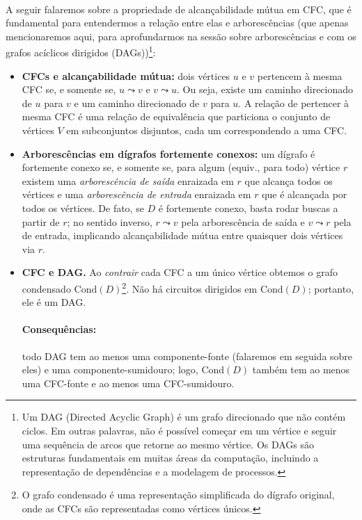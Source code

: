 \documentclass[12pt,a4paper]{article}
\begin{document}
\paragraph{}
A seguir falaremos sobre a propriedade de alcançabilidade mútua em CFC, que é fundamental para entendermos a relação entre elas e arborescências (que apenas mencionaremos aqui, para aprofundarmos na sessão sobre arborescências e com os grafos acíclicos dirigidos (DAGs))\footnote{Um DAG (Directed Acyclic Graph) é um grafo direcionado que não contém ciclos. Em outras palavras, não é possível começar em um vértice e seguir uma sequência de arcos que retorne ao mesmo vértice. Os DAGs são estruturas fundamentais em muitas áreas da computação, incluindo a representação de dependências e a modelagem de processos.}:

\begin{itemize}
    \item \textbf{CFCs e alcançabilidade mútua:} dois vértices \(u\) e \(v\) pertencem à mesma CFC se, e somente se, \(u\leadsto v\) e \(v\leadsto u\). Ou seja, existe um caminho direcionado de \(u\) para \(v\) e um caminho direcionado de \(v\) para \(u\). A relação de pertencer à mesma CFC é uma relação de equivalência que particiona o conjunto de vértices \(V\) em subconjuntos disjuntos, cada um correspondendo a uma CFC.
    \item \textbf{Arborescências em dígrafos fortemente conexos:} um dígrafo é fortemente conexo se, e somente se, para algum (equiv., para todo) vértice $r$ existem uma \emph{arborescência de saída} enraizada em $r$ que alcança todos os vértices e uma \emph{arborescência de entrada} enraizada em $r$ que é alcançada por todos os vértices. De fato, se $D$ é fortemente conexo, basta rodar buscas a partir de $r$; no sentido inverso, $r\leadsto v$ pela arborescência de saída e $v\leadsto r$ pela de entrada, implicando alcançabilidade mútua entre quaisquer dois vértices via $r$.
    \item \textbf{CFC e DAG.} Ao \emph{contrair} cada CFC a um único vértice obtemos o grafo condensado $\mathrm{Cond}(D)$\footnote{O grafo condensado é uma representação simplificada do dígrafo original, onde as CFCs são representadas como vértices únicos.}. Não há circuitos dirigidos em $\mathrm{Cond}(D)$; portanto, ele é um DAG.
    
    \paragraph{Consequências:}
     todo DAG tem ao menos uma componente-fonte (falaremos em seguida sobre eles) e uma componente-sumidouro; logo, $\mathrm{Cond}(D)$ também tem ao menos uma CFC-fonte e ao menos uma CFC-sumidouro.
\end{itemize}
\end{document}
